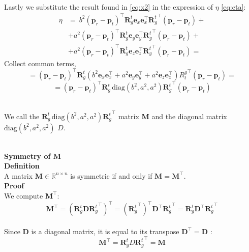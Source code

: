 \documentclass[main]{subfiles}
\begin{document}
\noindent\\
Lastly we substitute the result found in \ref{eq:x2} in the expression of $\eta$ \eqref{eq:eta}:
\[
\begin{aligned}
    \eta &=  \ b^2 \left(\mathbf{p}_r - \mathbf{p}_t\right)^\top \mathbf{R}_g^t \mathbf{e}_x \mathbf{e}_x^\top {\mathbf{R}_g^t}^\top \left(\mathbf{p}_r - \mathbf{p}_t\right) + \\
    &+ a^2 \left(\mathbf{p}_r - \mathbf{p}_t\right)^\top \mathbf{R}_g^t \mathbf{e}_y \mathbf{e}_y^\top {\mathbf{R}_g^t}^\top \left(\mathbf{p}_r - \mathbf{p}_t\right) +\\
    &+ a^2 \left(\mathbf{p}_r - \mathbf{p}_t\right)^\top \mathbf{R}_g^t \mathbf{e}_z \mathbf{e}_z^\top {\mathbf{R}_g^t}^\top \left(\mathbf{p}_r - \mathbf{p}_t\right) =
\end{aligned}
\]
Collect common terms,
\[
= \left(\mathbf{p}_r - \mathbf{p}_t\right)^\top \mathbf{R}_g^t \left( b^2 \mathbf{e}_x \mathbf{e}_x^\top + a^2 \mathbf{e}_y \mathbf{e}_y^\top + a^2 \mathbf{e}_z \mathbf{e}_z^\top \right) {R_t^g}^\top \left(\mathbf{p}_r - \mathbf{p}_t\right)=
\]
\begin{equation}
    = \left(\mathbf{p}_r - \mathbf{p}_t\right)^\top \mathbf{R}_g^t \, \text{diag}(b^2, a^2, a^2) {\mathbf{R}_g^t}^\top \left(\mathbf{p}_r - \mathbf{p}_t\right)
    \label{eq:eta2}
\end{equation}

\noindent\\
We call the \( \mathbf{R}_g^t \, \text{diag}(b^2, a^2, a^2) {\mathbf{R}_g^t}^\top \) matrix $\mathbf{M}$ and the diagonal matrix $\text{diag}(b^2, a^2, a^2)$ $D$.

\noindent\\
\textbf{Symmetry of \( \mathbf{M} \)}\noindent\\
\textbf{Definition}\noindent\\
A matrix \( \mathbf{M} \in \mathbb{R}^{n \times n} \) is symmetric if and only if \( \mathbf{M} = \mathbf{M}^\top \).
\noindent\\
\textbf{Proof} \noindent\\
We compute \( \mathbf{M}^\top \):
\[
    \mathbf{M}^\top = \left( \mathbf{R}_g^t \mathbf{D} {\mathbf{R}_g^t}^\top \right)^\top = \left( {\mathbf{R}_g^t}^\top \right)^\top \mathbf{D}^\top {\mathbf{R}_g^t}^\top = \mathbf{R}_g^t \mathbf{D}^\top {\mathbf{R}_g^t}^\top
\]
\noindent\\
Since \( \mathbf{D} \) is a diagonal matrix, it is equal to its transpose $\mathbf{D}^\top = \mathbf{D}$ :
$$
\mathbf{M}^\top =  \mathbf{R}_g^t D {\mathbf{R}_g^t}^\top = \mathbf{M}
$$
\end{document}
